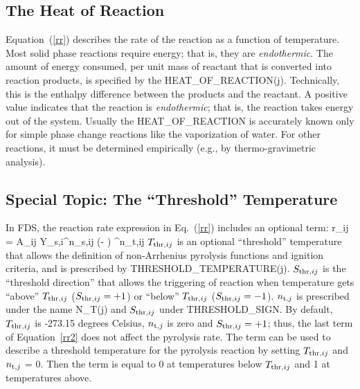 \documentclass[11pt]{book}
\begin{document}
\subsection{The Heat of Reaction}

Equation~(\ref{rr}) describes the rate of the reaction as a function of temperature.  Most solid phase reactions require energy; that is, they are {\em endothermic}. The amount of energy consumed, per unit mass of reactant that is converted into reaction products, is specified by the {\ct HEAT\_OF\_REACTION(j)}. Technically, this is the enthalpy difference between the products and the reactant. A positive value indicates that the reaction is {\em endothermic}; that is, the reaction takes energy out of the system. Usually the {\ct HEAT\_OF\_REACTION} is accurately known only for simple phase change reactions like the vaporization of water. For other reactions, it must be determined empirically (e.g., by thermo-gravimetric analysis).


\subsection{Special Topic: The ``Threshold'' Temperature}
\label{info:threshold_temperature}

In FDS, the reaction rate expression in Eq.~(\ref{rr}) includes an optional term:
\be
  r_{ij} = A_{ij} \; Y_{{\rm s},i}^{n_{{\rm s},ij}} \; \exp \left(- \right) \;
  \max{}^{n_{{\rm t},ij}}
  \label{rr2}
\ee
$T_{{\rm thr},ij}$ is an optional ``threshold'' temperature that allows the definition of non-Arrhenius pyrolysis functions and ignition criteria, and is prescribed by {\ct THRESHOLD\_TEMPERATURE(j)}. $S_{{\rm thr},ij}$ is the ``threshold direction'' that allows the triggering of reaction when temperature gets ``above'' $T_{{\rm thr},ij}$ ($S_{{\rm thr},ij}=+1$) or ``below'' $T_{{\rm thr},ij}$ ($S_{{\rm thr},ij}=-1$). $n_{{\rm t},j}$ is prescribed under the name {\ct N\_T(j)} and $S_{{\rm thr},ij}$ under {\ct THRESHOLD\_SIGN}. By default, $T_{{\rm thr},ij}$ is -273.15 degrees Celsius, $n_{{\rm t},j}$ is zero and $S_{{\rm thr},ij}=+1$; thus, the last term of Equation~\ref{rr2} does not affect the pyrolysis rate. The term can be used to describe a threshold temperature for the pyrolysis reaction by setting $T_{{\rm thr},ij}$ and $n_{{\rm t},j}$ = 0. Then the term is equal to 0 at temperatures below $T_{{\rm thr},ij}$ and 1 at temperatures above.
\end{document}
